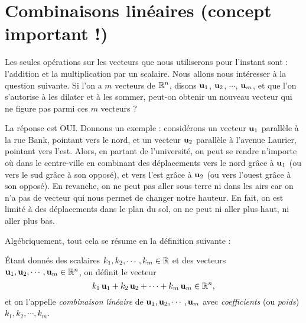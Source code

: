 \section{Combinaisons linéaires (concept important !)}
Les seules opérations sur les vecteurs que nous utiliserons pour l'instant sont : l'addition et la multiplication par un scalaire.
Nous allons nous intéresser à la question suivante.  
Si l'on a $m$ vecteurs de $\mathbb{R}^n$, disons $\mathbf{u}_1$, ${\mathbf{u}_2}$, $\cdots$, ${\mathbf{u}_m}$, et que l'on s'autorise à les dilater et à les sommer, peut-on obtenir un nouveau vecteur qui ne figure pas parmi ces $m$ vecteurs
 ?

La réponse est OUI. Donnons un exemple :  considérons un vecteur ${\mathbf{u}_1}$ parallèle à la rue Bank, pointant vers le nord,
et un vecteur ${\mathbf{u}_2}$  parallèle à l'avenue Laurier, pointant vers l'est. Alors, en partant de l'université, on peut se rendre n'importe où dans le centre-ville en 
combinant des déplacements vers le nord grâce à ${\mathbf{u}_1}$ (ou vers le sud grâce à son opposé), et vers l'est grâce à ${\mathbf{u}_2}$ (ou vers l'ouest grâce à son
opposé). En revanche, on ne peut pas aller sous terre ni
dans les airs car on n'a pas de vecteur qui nous permet de changer notre hauteur.  En fait, on est limité à des déplacements dans le plan du sol, on ne peut ni aller plus haut, ni aller plus bas.

Algébriquement, tout cela se résume en la définition suivante :


\begin{definition} 
Étant donnés des scalaires $k_1, k_2, \cdots, k_m \in \mathbb{R}$ et des vecteurs ${\mathbf{u}_1}, {\mathbf{u}_2}, \cdots, {\mathbf{u}_m}\in \mathbb{R}^n$, on définit le vecteur 
$$
k_1\,{\mathbf{u}_1} + k_2\,{\mathbf{u}_2} + \cdots + k_m\,{\mathbf{u}_m} \in \mathbb{R}^n,
$$
et on l'appelle \emph{combinaison linéaire} de ${\mathbf{u}_1},{\mathbf{u}_2},\cdots,{\mathbf{u}_m}$ avec \emph{coefficients} (ou \emph{poids}) $k_1, k_2, \cdots, k_m$.
\end{definition}

